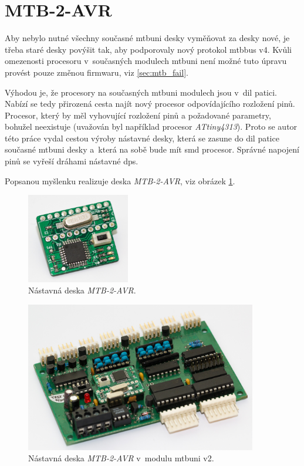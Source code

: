\newpage
\section{MTB-2-AVR} \label{sec:mtb-2-avr}

Aby nebylo nutné všechny současné \gls{mtbuni} desky vyměňovat za desky nové,
je třeba staré desky povýšit tak, aby podporovaly nový protokol \gls{mtbbus} v4.
Kvůli omezenosti procesoru v~současných modulech \gls{mtbuni} není možné tuto
úpravu provést pouze změnou firmwaru, viz \ref{sec:mtb_fail}.

Výhodou je, že procesory na současných \gls{mtbuni} modulech jsou
v~\gls{dil} patici. Nabízí se tedy přirozená cesta najít nový procesor
odpovídajícího rozložení pinů. Procesor, který by měl vyhovující rozložení pinů
a požadované parametry, bohužel neexistuje (uvažován byl například procesor
\textit{ATtiny4313}). Proto se autor této práce vydal cestou výroby nástavné
desky, která se zasune do \gls{dil} patice současné \gls{mtbuni} desky
a~která na sobě bude mít \gls{smd} procesor. Správné napojení pinů se vyřeší
dráhami nástavné \gls{dps}.

Popsanou myšlenku realizuje deska \textit{MTB-2-AVR}, viz obrázek
\ref{fig:mtb-2-avr-alone}.

\begin{figure}[ht]
\includegraphics[width=0.4\textwidth]{data/uni-2-upgrade-alone.jpg}
\caption{Nástavná deska \textit{MTB-2-AVR}.}
\label{fig:mtb-2-avr-alone}
\end{figure}

\begin{figure}[ht]
\includegraphics[width=0.9\textwidth]{data/uni-2-upgrade-all.jpg}
\caption{Nástavná deska \textit{MTB-2-AVR} v~modulu \gls{mtbuni} v2.}
\label{fig:mtb-2-avr-inside}
\end{figure}

